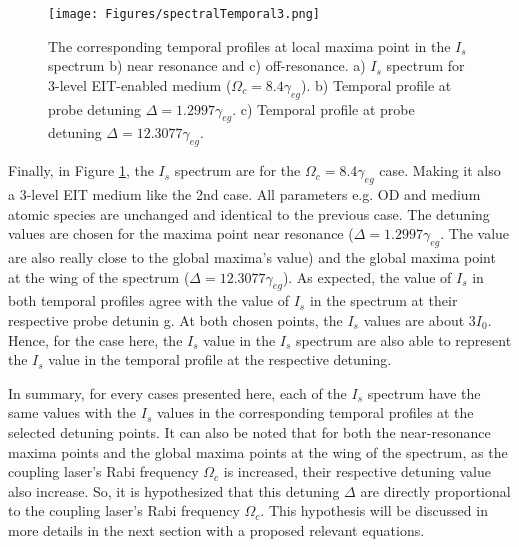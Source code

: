 \newpage

\begin{figure}[h!]
    \centering
    \texttt{[image: Figures/spectralTemporal3.png]}
    \caption{The corresponding temporal profiles at local maxima point in the $I_{s}$ spectrum b) near resonance and c) off-resonance. a) $I_{s}$ spectrum for 3-level EIT-enabled medium ($\Omega_{c} = 8.4\gamma_{eg}$). b) Temporal profile at probe detuning $\Delta = 1.2997\gamma_{eg}$. c) Temporal profile at probe detuning $\Delta = 12.3077\gamma_{eg}$.}
    \label{fig: corresponding temporal profile 3}
\end{figure}

Finally, in Figure \ref{fig: corresponding temporal profile 3}, the $I_{s}$ spectrum are for the $\Omega_{c} = 8.4\gamma_{eg}$ case. Making it also a 3-level EIT medium like the 2nd case. All parameters e.g. OD and medium atomic species are unchanged and identical to the previous case. The detuning values are chosen for the maxima point near resonance ($\Delta = 1.2997\gamma_{eg}$. The value are also really close to the global maxima's value) and the global maxima point at the wing of the spectrum ($\Delta = 12.3077\gamma_{eg}$). As expected, the value of $I_{s}$ in both temporal profiles agree with the value of $I_{s}$ in the spectrum at their respective probe detunin  g. At both chosen points, the $I_{s}$ values are about $3I_{0}$. Hence, for the case here, the $I_{s}$ value in the $I_{s}$ spectrum are also able to represent the $I_{s}$ value in the temporal profile at the respective detuning.

\newpage

In summary, for every cases presented here, each of the $I_{s}$ spectrum have the same values with the $I_{s}$ values in the corresponding temporal profiles at the selected detuning points. It can also be noted that for both the near-resonance maxima points and the global maxima points at the wing of the spectrum, as the coupling laser's Rabi frequency $\Omega_{c}$ is increased, their respective detuning value also increase. So, it is hypothesized that this detuning $\Delta$ are directly proportional to the coupling laser's Rabi frequency $\Omega_{c}$. This hypothesis will be discussed in more details in the next section with a proposed relevant equations.


